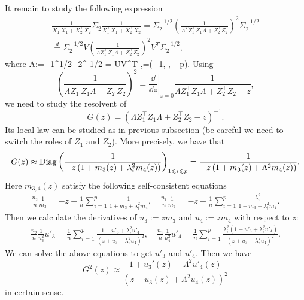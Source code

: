 It remain to study the following expression 
\begin{align*}
\frac{1}{X_1^{\top}X_1 + X_2^{\top}X_2}  \Sigma_2 \frac{1}{X_1^{\top}X_1 + X_2^{\top}X_2}  = \Sigma_2^{-1/2}\left(\frac{1}{A^T Z_1^{\top}Z_1 A + Z_2^{\top}Z_2} \right)^2 \Sigma_2^{-1/2} \\
\stackrel{d}{=} \Sigma_2^{-1/2}V \left(\frac{1}{\Lambda Z_1^{\top}Z_1 \Lambda + Z_2^{\top}Z_2} \right)^2 V^T \Sigma_2^{-1/2},
\end{align*}
where 
\be  \label{eigen2}
A:=\Sigma_1^{1/2}\Sigma_2^{-1/2} = U\Lambda V^T ,\quad \Lambda=(\lambda_1, \cdots, \lambda_p).
\ee
Using 
$$\left(\frac{1}{\Lambda Z_1^{\top}Z_1 \Lambda + Z_2^{\top}Z_2} \right)^2 =\left. \frac{\dd }{\dd z}\right|_{z=0}\frac{1}{\Lambda Z_1^{\top}Z_1 \Lambda + Z_2^{\top}Z_2 - z} ,$$
we  need to study the resolvent of 
$$G(z) = \left( \Lambda Z_1^{\top}Z_1 \Lambda + Z_2^{\top}Z_2 - z \right)^{-1}.$$
Its local law can be studied as in previous subsection (be careful we need to switch the roles of $Z_1$ and $Z_2$). More precisely,  we have that 
$$ G(z) \approx \operatorname{Diag}\left( \frac{1}{-z\left( 1+ m_3(z) + \lambda_i^2 m_4(z)\right)}\right)_{1\leqslant i \leqslant p}= \frac{1}{-z\left( 1+ m_3(z) + \Lambda^2 m_4(z)\right)} .$$
Here $m_{3,4}(z)$ satisfy the following self-consistent equations
\begin{align}\label{m34shift}
\frac{n_2}{n}\frac1{m_3} = - z +\frac1n\sum_{i=1}^p \frac1{  1+m_3 + \lambda_i^2m_4  } ,\quad \frac{n_1}{n}\frac1{m_4} = - z +\frac1n\sum_{i=1}^p \frac{\lambda_i^2 }{  1+m_3 + \lambda_i^2m_4  } .
\end{align}
Then we calculate the derivatives of $u_3:=zm_3$ and $u_4:=zm_4$ with respect to $z$:
\begin{align}\label{dotm34}
\frac{n_2}{n}\frac1{u_3^2}u'_3 =  \frac1n\sum_{i=1}^p \frac{1+u'_3 + \lambda_i^2 u'_4}{ ( z+u_3 + \lambda_i^2u_4)^2  } ,\quad \frac{n_1}{n}\frac1{u_4^2}u'_4 =   \frac1n\sum_{i=1}^p \frac{\lambda_i^2\left(1+u'_3 + \lambda_i^2 u'_4\right) }{  (z+u_3 + \lambda_i^2u_4)^2  } .
\end{align}
We can solve the above equations to get $u'_3$ and $u'_4$. Then we have 
$$ G^2(z) \approx   \frac{1 +  u_3'(z) +\Lambda^2 u'_4(z)}{ \left( z+ u_3(z) + \Lambda^2  u_4(z)\right)^2}  $$
{\cob in certain sense}.

